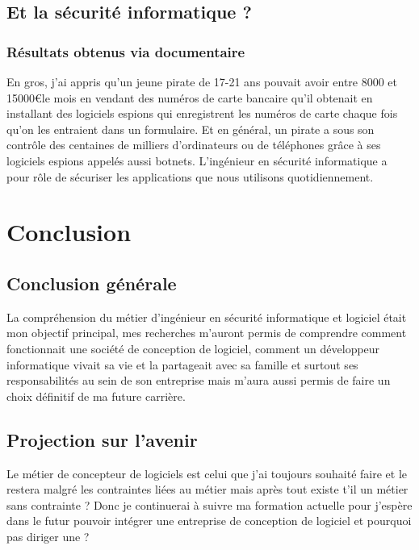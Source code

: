 \documentclass[11pt]{article}
\begin{document}
\begin{onehalfspace}
		\subsection{Et la sécurité informatique ?}
		\subsubsection{Résultats obtenus via documentaire}
		En gros, j'ai appris qu'un jeune pirate de 17-21 ans pouvait avoir entre 8000 et 15000\euro le mois en vendant des numéros de carte bancaire qu'il obtenait en installant des logiciels espions qui enregistrent les numéros de carte chaque fois qu'on les entraient dans un formulaire. Et en général, un pirate a sous son contrôle des centaines de milliers d'ordinateurs ou de téléphones grâce à ses logiciels espions appelés aussi botnets.\cite{pirates} L'ingénieur en sécurité informatique a pour rôle de sécuriser les applications que nous utilisons quotidiennement.
		\newpage
		
		\section{Conclusion}
		\subsection{Conclusion générale}
		La compréhension du métier d'ingénieur en sécurité informatique et logiciel était mon objectif principal, mes recherches m'auront permis de comprendre comment fonctionnait une société de conception de logiciel, comment un développeur informatique vivait sa vie et la partageait avec sa famille et surtout ses responsabilités au sein de son entreprise mais m'aura aussi permis de faire un choix définitif de ma future carrière.
		\subsection{Projection sur l'avenir}
		Le métier de concepteur de logiciels est celui que j'ai toujours souhaité faire et le restera malgré les contraintes liées au métier mais après tout existe t'il un métier sans contrainte ? Donc je continuerai à suivre ma formation actuelle pour j'espère dans le futur pouvoir intégrer une entreprise de conception de logiciel et pourquoi pas diriger une ?
		\newpage
	\end{onehalfspace}


\end{document}
